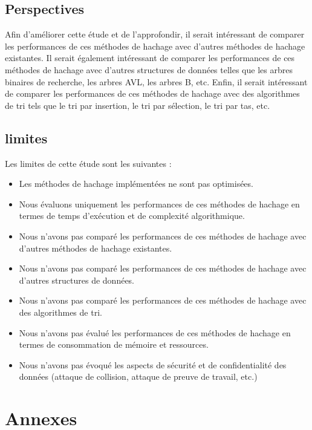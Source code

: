 \documentclass{article}
\begin{document}
    \subsection{Perspectives}\label{subsec:perspectives}

    Afin d'améliorer cette étude et de l'approfondir, il serait intéressant de comparer les performances de ces méthodes de hachage avec d'autres méthodes de hachage existantes.
    Il serait également intéressant de comparer les performances de ces méthodes de hachage avec d'autres structures de données telles que les arbres binaires de recherche, les arbres AVL, les arbres B, etc.
    Enfin, il serait intéressant de comparer les performances de ces méthodes de hachage avec des algorithmes de tri tels que le tri par insertion, le tri par sélection, le tri par tas, etc.

    \subsection{limites}\label{subsec:limites}

    Les limites de cette étude sont les suivantes :
    \begin{itemize}
        \item Les méthodes de hachage implémentées ne sont pas optimisées.
        \item Nous évaluons uniquement les performances de ces méthodes de hachage en termes de temps d'exécution et de complexité algorithmique.
        \item Nous n'avons pas comparé les performances de ces méthodes de hachage avec d'autres méthodes de hachage existantes.
        \item Nous n'avons pas comparé les performances de ces méthodes de hachage avec d'autres structures de données.
        \item Nous n'avons pas comparé les performances de ces méthodes de hachage avec des algorithmes de tri.
        \item Nous n'avons pas évalué les performances de ces méthodes de hachage en termes de consommation de mémoire et ressources.
        \item Nous n'avons pas évoqué les aspects de sécurité et de confidentialité des données (attaque de collision, attaque de preuve de travail, etc.)
    \end{itemize}

    \newpage
    \section{Annexes}\label{sec:annexes}
\end{document}
